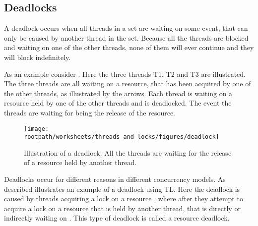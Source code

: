\subsection{Deadlocks}
A deadlock occurs when all threads in a set are waiting on some event, that can only be caused by another thread in the set\cite[p. 435]{tanenbaum2008modern}. Because all the threads are blocked and waiting on one of the other threads, none of them will ever continue and they will block indefinitely.

As an example consider . Here the three threads T1, T2 and T3 are illustrated. The three threads are all waiting on a resource, that has been acquired by one of the other threads, as illustrated by the arrows. Each thread is waiting on a resource held by one of the other threads and is deadlocked. The event the threads are waiting for being the release of the resource.
\begin{figure}[htbp]
\centering
 \texttt{[image: \\rootpath/worksheets/threads\_and\_locks/figures/deadlock]} 
 \caption{Illustration of a deadlock. All the threads are waiting for the release of a resource held by another thread.}
\label{fig:deadlockexample}
\end{figure}

Deadlocks occur for different reasons in different concurrency models. As described  illustrates an example of a deadlock using \ac{TL}. Here the deadlock is caused by threads acquiring a lock on a resource , where after they attempt to acquire a lock on a resource that is held by another thread, that is directly or indirectly waiting on . This type of deadlock is called a resource deadlock\cite[p. 435]{tanenbaum2008modern}. 


